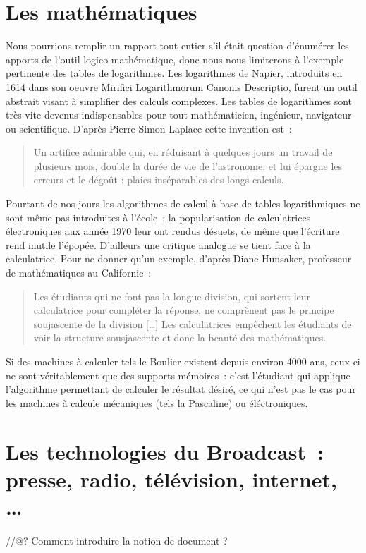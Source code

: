 \section{Les mathématiques}
Nous pourrions remplir un rapport tout entier s'il était question d'énumérer les apports de l'outil logico-mathématique, donc nous nous limiterons à l'exemple pertinente des tables de logarithmes. Les logarithmes de Napier, introduits en 1614 dans son oeuvre \og{}Mirifici Logarithmorum Canonis Descriptio\fg{}, furent un outil abstrait visant à simplifier des calculs complexes. Les tables de logarithmes sont très vite devenus indispensables pour tout mathématicien, ingénieur, navigateur ou scientifique. D'après Pierre-Simon Laplace cette invention est\cite{history-of-astronomy}~:
\begin{quote}
Un artifice admirable qui, en réduisant à quelques jours un travail de plusieurs mois, double la durée de vie de l'astronome, et lui épargne les erreurs et le dégoût : plaies inséparables des longs calculs.
\end{quote}
Pourtant de nos jours les algorithmes de calcul à base de tables logarithmiques ne sont même pas introduites à l'école~: la popularisation de calculatrices électroniques aux année 1970 leur ont rendus désuets, de même que l'écriture rend inutile l'épopée. D'ailleurs une critique analogue se tient face à la calculatrice. Pour ne donner qu'un exemple, d'après Diane Hunsaker, professeur de mathématiques au Californie\cite{eduworld}~:
\begin{quote}
Les étudiants qui ne font pas la longue-division, qui sortent leur calculatrice pour compléter la réponse, ne comprènent pas le principe soujascente de la division [\ldots] Les calculatrices empêchent les étudiants de voir la structure sousjascente et donc la beauté des mathématiques.
\end{quote}
Si des machines à calculer tels le Boulier existent depuis environ 4000 ans, ceux-ci ne sont véritablement que des supports mémoires~: c'est l'étudiant qui applique l'algorithme permettant de calculer le résultat désiré, ce qui n'est pas le cas pour les machines à calcule mécaniques (tels la Pascaline) ou éléctroniques.


\section{Les technologies du \og{}Broadcast\fg{}~: presse, radio, télévision, internet, \ldots}


//@? Comment introduire la notion de document ?

